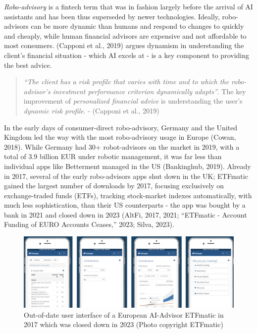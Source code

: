 \documentclass[
  letterpaper,
  DIV=11,
  numbers=noendperiod]{scrartcl}
\begin{document}
\emph{Robo-advisory} is a fintech term that was in fashion largely
before the arrival of AI assistants and has been thus superseded by
newer technologies. Ideally, robo-advisors can be more dynamic than
humans and respond to changes to quickly and cheaply, while human
financial advisors are expensive and not affordable to most consumers.
(Capponi et al., 2019) argues dynamism in understanding the client's
financial situation - which AI excels at - is a key component to
providing the best advice.

\begin{quote}
\emph{``The client has a risk profile that varies with time and to which
the robo-advisor's investment performance criterion dynamically
adapts''}. The key improvement of \emph{personalized financial advice}
is understanding the user's \emph{dynamic risk profile}. - (Capponi et
al., 2019)
\end{quote}

In the early days of consumer-direct robo-advisory, Germany and the
United Kingdom led the way with the most robo-advisory usage in Europe
(Cowan, 2018). While Germany had 30+ robot-advisors on the market in
2019, with a total of 3.9 billion EUR under robotic management, it was
far less than individual apps like Betterment managed in the US
(Bankinghub, 2019). Already in 2017, several of the early robo-advisors
apps shut down in the UK; ETFmatic gained the largest number of
downloads by 2017, focusing exclusively on exchange-traded funds (ETFs),
tracking stock-market indexes automatically, with much less
sophistication, than their US counterparts - the app was bought by a
bank in 2021 and closed down in 2023 (AltFi, 2017, 2021; {``{ETFmatic} -
{Account} Funding of {EURO} Accounts Ceases,''} 2023; Silva, 2023).

\begin{figure}[H]

{\centering \includegraphics[width=1\linewidth,height=\textheight,keepaspectratio]{./images/ai/etfmatic.png}

}

\caption{Out-of-date user interface of a European AI-Advisor ETFmatic in
2017 which was closed down in 2023 (Photo copyright ETFmatic)}

\end{figure}%
\end{document}
